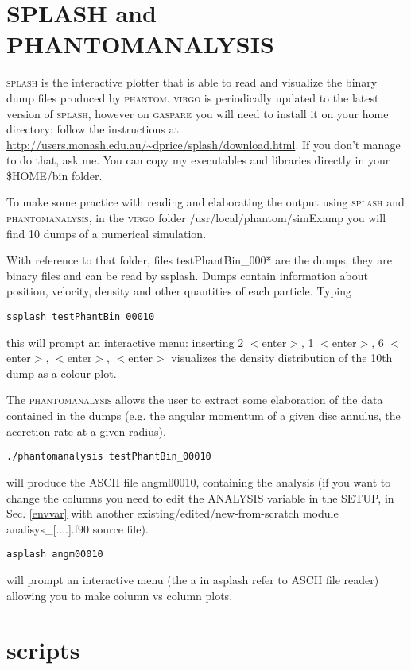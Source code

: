 \documentclass[10pt,a4paper,twoside]{article} %
\begin{document}
\section{SPLASH and PHANTOMANALYSIS}\label{phansplash}

\textsc{splash} is the interactive plotter that is able to read and visualize the binary dump files produced by \textsc{phantom}. 
\textsc{virgo} is periodically updated to the latest version of \textsc{splash}, however on \textsc{gaspare} you will need to install it on your home directory: follow the instructions at \url{http://users.monash.edu.au/~dprice/splash/download.html}. If you don't manage to do that, ask me. You can copy my executables and libraries directly in your \$HOME/bin folder.

To make some practice with reading and elaborating the output using \textsc{splash} and \textsc{phantomanalysis}, in the \textsc{virgo} folder /usr/local/phantom/simExamp you will find 10 dumps of a numerical simulation.

With reference to that folder, files testPhantBin\_000* are the dumps, they are binary files and can be read by ssplash. Dumps contain information about position, velocity, density and other quantities of each particle.
Typing
\begin{verbatim}
ssplash testPhantBin_00010
\end{verbatim}
this will prompt an interactive menu: inserting 2 $<$enter$>$, 1 $<$enter$>$, 6 $<$enter$>$, $<$enter$>$, $<$enter$>$ visualizes the density distribution of the 10th dump as a colour plot.

The \textsc{phantomanalysis} allows the user to extract some elaboration of the data contained in the dumps (e.g. the angular momentum of a given disc annulus, the accretion rate at a given radius). 
\begin{verbatim}
./phantomanalysis testPhantBin_00010
\end{verbatim}
will produce the ASCII file angm00010, containing the analysis (if you want to change the columns you need to edit the ANALYSIS variable in the SETUP, in Sec. \ref{envvar} with another existing/edited/new-from-scratch module analisys\_[....].f90 source file).
\begin{verbatim}
asplash angm00010
\end{verbatim}
will prompt an interactive menu (the a in asplash refer to ASCII file reader) allowing you to make column vs column plots.

\section{scripts}
\end{document}
